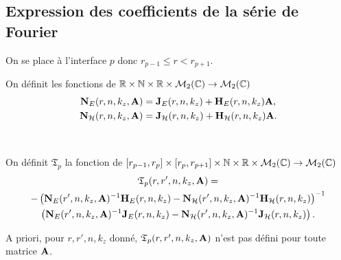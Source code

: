   \subsection{Expression des coefficients de la série de Fourier}

    On se place à l'interface \(p\) donc \(r_{p-1} \le r < r_{p+1} \).

    \begin{defn}
      \label{def:cylindre:matrices_NE-NH}
      On définit les fonctions de \(\mathbb R\times \mathbb N \times \mathbb R \times \mathcal{M}_{2}(\mathbb C) \rightarrow \mathcal{M}_{2}(\mathbb C)\)
      \begin{align*}
        \mathbf{N}_{E}(r,n,k_z,\mathbf{A}) &= \mathbf{J}_{E}(r,n,k_z) + \mathbf{H}_{E}(r,n,k_z)\mathbf{A},
        \\
        \mathbf{N}_{\mathcal{H}}(r,n,k_z,\mathbf{A}) &= \mathbf{J}_{\mathcal{H}}(r,n,k_z) + \mathbf{H}_{\mathcal{H}}(r,n,k_z)\mathbf{A}.
      \end{align*}
    \end{defn}

    \begin{defn}%
      \label{def:cylindre:transfert:reflexion}{}~

      On définit \(\mathfrak{T}_p\) la fonction de \([r_{p-1}, r_p]\times[r_p, r_{p+1}]\times\mathbb N\times\mathbb R\times\mathcal{M}_2(\mathbb C)\rightarrow \mathcal{M}_{2}(\mathbb C)\)
      \begin{multline*}
        \mathfrak{T}_p(r,r',n,k_z,\mathbf{A}) = \\
          -\left(\mathbf{N}_{E}(r',n,k_z,\mathbf{A})^{-1}\mathbf{H}_{E}(r,n,k_z) - \mathbf{N}_{\mathcal{H}}(r',n,k_z,\mathbf{A})^{-1}\mathbf{H}_{\mathcal{H}}(r,n,k_z)\right)^{-1}
          \\
          \left(\mathbf{N}_{E}(r',n,k_z,\mathbf{A})^{-1}\mathbf{J}_{E}(r,n,k_z) - \mathbf{N}_{\mathcal{H}}(r',n,k_z,\mathbf{A})^{-1}\mathbf{J}_{\mathcal{H}}(r,n,k_z)\right).
      \end{multline*}
    \end{defn}
    A priori, pour \(r,r',n,k_z\) donné, \(\mathfrak{T}_p(r,r',n,k_z,\mathbf{A})\) n'est pas défini pour toute matrice \(\mathbf{A}\).

